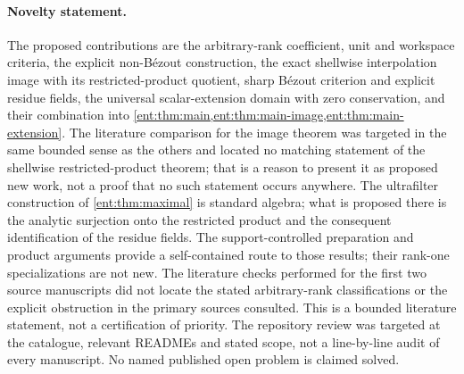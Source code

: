 \documentclass[11pt]{article}
\theoremstyle{plain}
\theoremstyle{plain}
\theoremstyle{plain}
\theoremstyle{definition}
\theoremstyle{definition}
\theoremstyle{definition}
\theoremstyle{definition}
\theoremstyle{remark}
\begin{document}
\paragraph{Novelty statement.}
The proposed contributions are the arbitrary-rank coefficient, unit and
workspace criteria, the explicit non-B\'ezout construction, the exact
shellwise interpolation image with its restricted-product quotient, sharp
B\'ezout criterion and explicit residue fields, the universal
scalar-extension domain with zero conservation, and their combination into
\cref{ent:thm:main,ent:thm:main-image,ent:thm:main-extension}. The literature
comparison for the image theorem was targeted in the same bounded sense as
the others and located no matching statement of the shellwise
restricted-product theorem; that is a reason to present it as proposed new
work, not a proof that no such statement occurs anywhere. The ultrafilter
construction of \cref{ent:thm:maximal} is standard algebra; what is proposed
there is the analytic surjection onto the restricted product and the
consequent identification of the residue fields. The support-controlled
preparation and product arguments provide a self-contained route to those
results; their rank-one specializations are not new. The literature checks
performed for the first two source manuscripts did not locate the stated
arbitrary-rank classifications or the explicit obstruction in the primary
sources consulted. This is a bounded literature statement, not a
certification of priority. The repository review was targeted at the
catalogue, relevant READMEs and stated scope, not a line-by-line audit of
every manuscript. No named published open problem is claimed solved.
\end{document}
